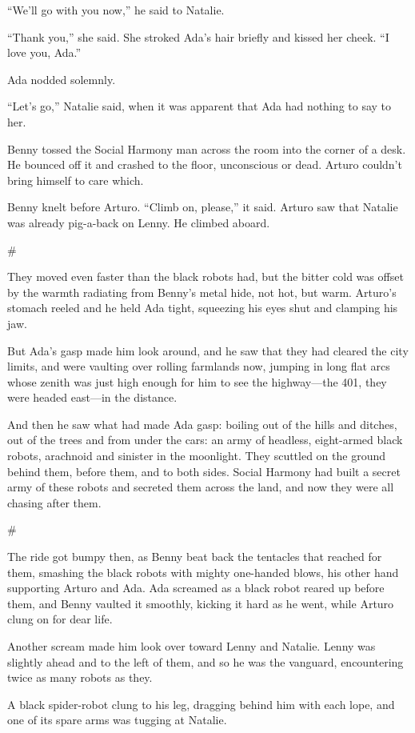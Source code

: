 “We’ll go with you now,” he said to Natalie.

“Thank you,” she said. She stroked Ada’s hair briefly and kissed
her cheek. “I love you, Ada.”

Ada nodded solemnly.

“Let’s go,” Natalie said, when it was apparent that Ada had nothing
to say to her.

Benny tossed the Social Harmony man across the room into the corner
of a desk. He bounced off it and crashed to the floor, unconscious
or dead. Arturo couldn’t bring himself to care which.

Benny knelt before Arturo. “Climb on, please,” it said. Arturo saw
that Natalie was already pig-a-back on Lenny. He climbed aboard.

\#

They moved even faster than the black robots had, but the bitter
cold was offset by the warmth radiating from Benny’s metal hide,
not hot, but warm. Arturo’s stomach reeled and he held Ada tight,
squeezing his eyes shut and clamping his jaw.

But Ada’s gasp made him look around, and he saw that they had
cleared the city limits, and were vaulting over rolling farmlands
now, jumping in long flat arcs whose zenith was just high enough
for him to see the highway—the 401, they were headed east—in the
distance.

And then he saw what had made Ada gasp: boiling out of the hills
and ditches, out of the trees and from under the cars: an army of
headless, eight-armed black robots, arachnoid and sinister in the
moonlight. They scuttled on the ground behind them, before them,
and to both sides. Social Harmony had built a secret army of these
robots and secreted them across the land, and now they were all
chasing after them.

\#

The ride got bumpy then, as Benny beat back the tentacles that
reached for them, smashing the black robots with mighty one-handed
blows, his other hand supporting Arturo and Ada. Ada screamed as a
black robot reared up before them, and Benny vaulted it smoothly,
kicking it hard as he went, while Arturo clung on for dear life.

Another scream made him look over toward Lenny and Natalie. Lenny
was slightly ahead and to the left of them, and so he was the
vanguard, encountering twice as many robots as they.

A black spider-robot clung to his leg, dragging behind him with
each lope, and one of its spare arms was tugging at Natalie.


